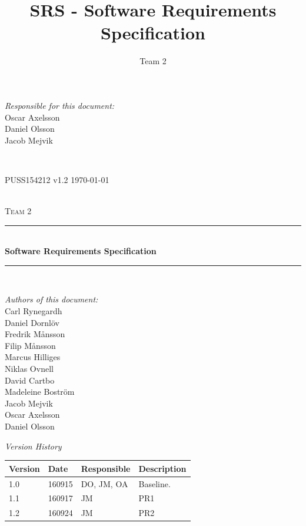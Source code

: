 \documentclass[a4paper]{article}
\title{SRS - Software Requirements Specification}
\author{Team 2}
\begin{document}
\begin{titlepage}
\newcommand{\HRule}{\rule{\linewidth}{0.5mm}}

\begin{minipage}{0.5\textwidth}
\begin{flushleft} %
\textit{Responsible for this document:}\\
Oscar Axelsson \\
Daniel Olsson \\
Jacob Mejvik
\end{flushleft}
\end{minipage}
~
\begin{minipage}{0.4\textwidth}
\begin{flushright}
PUSS154212 v1.2
\today
\end{flushright}
\end{minipage}\\[3cm]

\centering
\textsc{\LARGE Team 2}\\[0.5cm]

\HRule \\[0.4cm]
{ \huge \bfseries Software Requirements Specification}\\[0.4cm] %
\HRule \\[1.5cm]

\vfill
\begin{flushleft}
\textit{Authors of this document:}\\
Carl Rynegardh \\
Daniel Dornlöv \\
Fredrik Månsson \\
Filip Månsson \\
Marcus Hilliges \\
Niklas Ovnell \\
David Cartbo \\
Madeleine Boström \\
Jacob Mejvik \\
Oscar Axelsson \\
Daniel Olsson
\end{flushleft}



\end{titlepage}
\setcounter{tocdepth}{2}

\begin{center}
\textit{\large Version History}

    \begin{tabular}{ | l | l | l | p{5cm} |}
    \hline
    \textbf{Version} 	& \textbf{Date} 	& \textbf{Responsible} 	& \textbf{Description} 		\\ \hline
    1.0				 	& 160915 			& DO, JM, OA			&  Baseline. 				\\ \hline
    1.1				 	& 160917 			& JM					&  PR1				\\ \hline
    1.2				 	& 160924 			& JM					&  PR2				\\ \hline
    \end{tabular}
\end{center}
\end{document}
